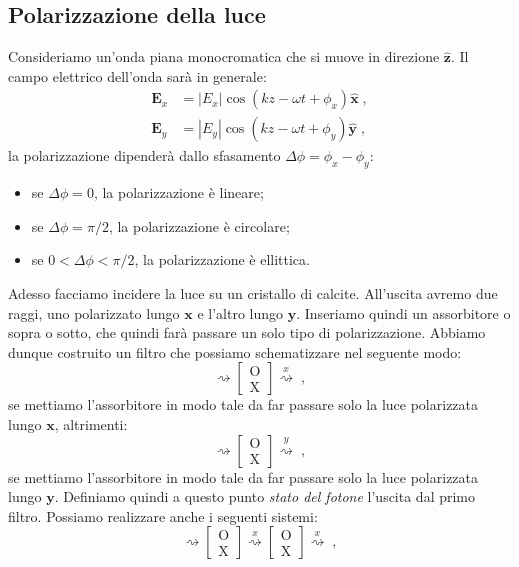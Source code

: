 \documentclass[10pt,a4paper]{report}
\theoremstyle{definition}
\numberwithin{equation}{section}
\begin{document}
\subsection*{Polarizzazione della luce}
Consideriamo un'onda piana monocromatica che si muove in direzione $\mathbf{\hat{z}}$. Il campo elettrico dell'onda sarà in generale:
\begin{align*}
\mathbf{E}_x &= |E_x|\cos(kz-\omega t+\phi_x)\mathbf{\hat{x}}\;, \\
\mathbf{E}_y &= |E_y|\cos(kz-\omega t+\phi_y)\mathbf{\hat{y}}\;,
\end{align*}
la polarizzazione dipenderà dallo sfasamento $\Delta\phi=\phi_x-\phi_y$:
\begin{itemize}
\item se $\Delta\phi=0$, la polarizzazione è lineare;
\item se $\Delta\phi=\pi/2$, la polarizzazione è circolare;
\item se $0<\Delta\phi<\pi/2$, la polarizzazione è ellittica.
\end{itemize}
Adesso facciamo incidere la luce su un cristallo di calcite. All'uscita avremo due raggi, uno polarizzato lungo $\mathbf{x}$ e l'altro lungo $\mathbf{y}$. Inseriamo quindi un assorbitore o sopra o sotto, che quindi farà passare un solo tipo di polarizzazione. Abbiamo dunque costruito un filtro che possiamo schematizzare nel seguente modo:
$$
\rightsquigarrow \left[
\begin{matrix}
\mathrm{O} \\
\mathrm{X}
\end{matrix}\right]\stackrel{x}{\rightsquigarrow}\;,
$$
se mettiamo l'assorbitore in modo tale da far passare solo la luce polarizzata lungo $\mathbf{x}$, altrimenti:
$$
\rightsquigarrow \left[
\begin{matrix}
\mathrm{O} \\
\mathrm{X}
\end{matrix}\right]\stackrel{y}{\rightsquigarrow}\;,
$$
se mettiamo l'assorbitore in modo tale da far passare solo la luce polarizzata lungo $\mathbf{y}$. Definiamo quindi a questo punto \textit{stato del fotone} l'uscita dal primo filtro. Possiamo realizzare anche i seguenti sistemi:
$$
\rightsquigarrow \left[
\begin{matrix}
\mathrm{O} \\
\mathrm{X}
\end{matrix}\right] \stackrel{x}{\rightsquigarrow}
\left[\begin{matrix}
\mathrm{O} \\
\mathrm{X}
\end{matrix}\right] \stackrel{x}{\rightsquigarrow}\;,
$$
\end{document}
